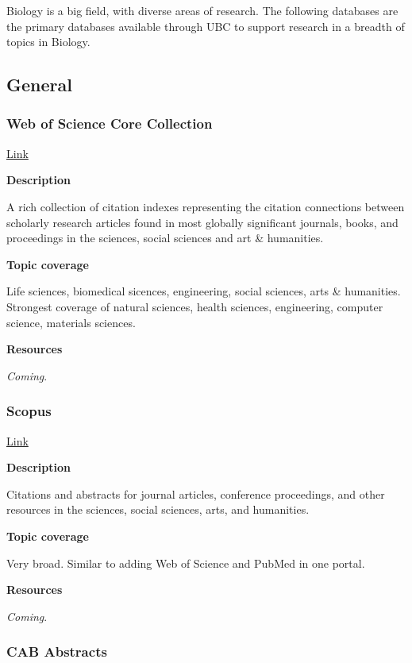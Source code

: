 \documentclass[
]{book}
\begin{document}
Biology is a big field, with diverse areas of research. The following databases are the primary databases available through UBC to support research in a breadth of topics in Biology.

\subsection{General}\label{general}

\subsubsection{Web of Science Core Collection}\label{web-of-science-core-collection}

\href{https://resources.library.ubc.ca/page.php?details=web-of-science-core-collection&id=138}{Link}

\textbf{Description}

A rich collection of citation indexes representing the citation connections between scholarly research articles found in most globally significant journals, books, and proceedings in the sciences, social sciences and art \& humanities.

\textbf{Topic coverage}

Life sciences, biomedical sicences, engineering, social sciences, arts \& humanities. Strongest coverage of natural sciences, health sciences, engineering, computer science, materials sciences.

\textbf{Resources}

\emph{Coming}.

\subsubsection{Scopus}\label{scopus}

\href{https://resources.library.ubc.ca/page.php?details=scopus&id=2677}{Link}

\textbf{Description}

Citations and abstracts for journal articles, conference proceedings, and other resources in the sciences, social sciences, arts, and humanities.

\textbf{Topic coverage}

Very broad. Similar to adding Web of Science and PubMed in one portal.

\textbf{Resources}

\emph{Coming}.

\subsubsection{CAB Abstracts}\label{cab-abstracts}
\end{document}
